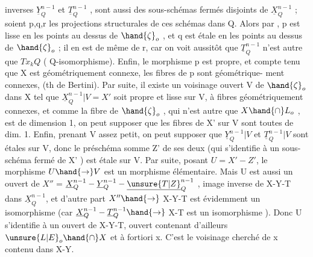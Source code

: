 
inverses $\underline{Y}^{n-1}_Q$ et $\underline{T}^{n-1}_Q$ ,  sont aussi des sous-schémas fermés disjoints de $\underline{X}^{n-1}_Q$ ; soient p,q,r les projections structurales
de ces schémas dans Q. Alors par , p est lisse en les
points au dessus de $\hand{\zeta}_o$ , et q est étale en les points au dessus de $\hand{\zeta}_o$ ;
il en est de même de r, car on voit aussitôt que $\underline{T}^{n-1}_Q$ n'est autre que
$Tx_kQ$ ( Q-isomorphisme). Enfin, le morphisme p est propre, et compte
tenu que X est géométriquement connexe, les fibres de p sont géométrique-%
ment connexes, (th de Bertini). Par suite, il existe un voisinage ouvert
V de $\hand{\zeta}_o$ dans X tel que  $\underline{X}^{n-1}_Q|V = X'$ soit propre et lisse
sur V, à fibres géométriquement connexes, et comme la fibre de $\hand{\zeta}_o$ ,
qui n'est autre que $X\hand{\cap} L_o$ , est de dimension 1, on peut supposer que les
fibres de X' sur V sont toutes de dim. 1. Enfin, prenant V assez petit,
on peut supposer que $\underline{Y}^{n-1}_Q|V$ et $\underline{T}^{n-1}_Q|V$ sont étales sur V, donc le
préschéma somme Z' de ses deux (qui s'identifie à un sous-schéma
fermé de X' ) est étale sur V. Par suite,  posant $U = X' - Z'$,
 le morphisme $U\hand{\to} V$ est un morphisme élémentaire. Mais  U est aussi
un ouvert de $X''=$$\underline{X}^{n-1}_Q - \underline{Y}^{n-1}_Q - \underline{\unsure{T|Z}}^{n-1}_Q$ , image inverse de X-Y-T dans $\underline{X}^{n-1}_Q$,
et d'autre part $X''\hand{\to}$ X-Y-T est évidemment un isomorphisme (car
$\underline{X}^{n-1}_Q - \underline{T}^{n-1}_Q \hand{\to}$ X-T est un isomorphisme ). Donc U s'identifie à un ouvert
de X-Y-T, ouvert contenant d'ailleurs $\unsure{L|E}_o\hand{\cap} X$ et à fortiori x. C'est le
voisinage cherché de x contenu dans X-Y.

